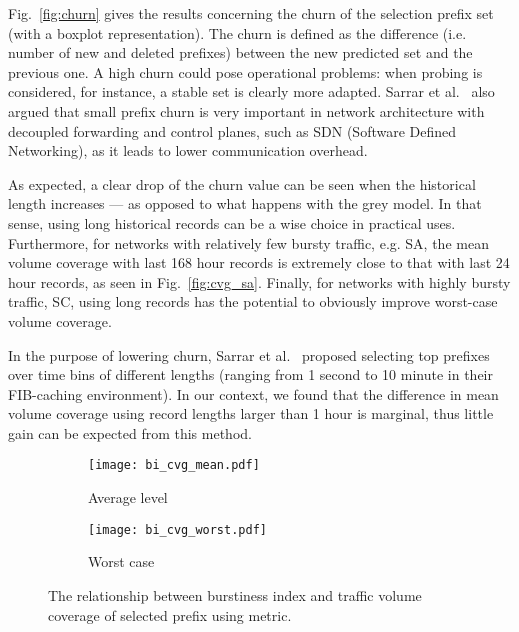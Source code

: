 \documentclass[10pt, conference,letterpaper]{IEEEtran}
\begin{document}
Fig.~\ref{fig:churn} gives the results concerning the churn of the selection prefix set (with a boxplot representation).
The churn is defined as the difference (i.e. number of new and deleted prefixes) between the new predicted set and the previous one. A high churn could pose operational problems: when probing is considered, for instance,  a stable set is clearly more adapted. Sarrar et al.\ \cite{Sarrar2012} also argued that small prefix churn is very important in network architecture with decoupled forwarding and control  planes, such as SDN (Software Defined Networking), as it leads to lower communication overhead.


As expected, a clear drop of the churn value can be seen when the historical length increases --- as opposed to what happens with the grey model. 
In that sense, using long historical records can be a wise choice in practical uses.
Furthermore, for networks with relatively few bursty traffic, e.g. SA, the mean volume coverage with last 168 hour records is extremely close to that with last 24 hour records, as seen in Fig.~\ref{fig:cvg_sa}.
Finally, for networks with highly bursty traffic, SC, using long records has the potential to obviously improve worst-case volume coverage. 

In the purpose of lowering churn, Sarrar et al.\ \cite{Sarrar2012} proposed selecting top prefixes over time bins of different lengths (ranging from 1 second to 10 minute in their FIB-caching environment). In our context, we found that the difference in mean volume coverage using record lengths larger than 1 hour is marginal, thus little gain can be expected from this method. 





\begin{figure}[!tb]
\centering
		\centering
        \begin{subfigure}[b]{0.21\textwidth}
        \centering
                \texttt{[image: bi\_cvg\_mean.pdf]}
                \caption{Average level}
                \label{fig:bi_cvg_mean}
        \end{subfigure}
        \hfill
        \begin{subfigure}[b]{0.27\textwidth}
                \texttt{[image: bi\_cvg\_worst.pdf]}
                \caption{Worst case}
                \label{fig:bi_cvg_worst}
        \end{subfigure}
\caption{The relationship between burstiness index  and traffic volume coverage of selected prefix using  metric.}
\label{fig:bi_cvg}
\end{figure}
\end{document}
